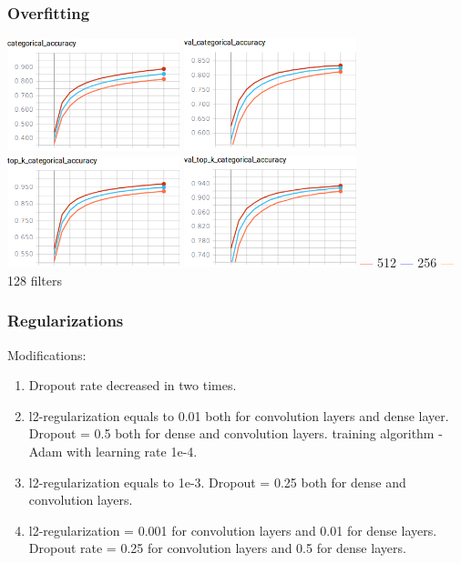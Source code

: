 \documentclass[14pt]{beamer}
\begin{document}
		\begin{frame}
			\frametitle{Overfitting}
			\hfil\hfil\includegraphics[width=5cm]{part4//3CNN_train_category_accuracy}
			\hfil\hfil\includegraphics[width=5cm]{part4//3CNN_val_category_accuracy}\newline
			\vfil
			\hfil\hfil\includegraphics[width=5cm]{part4/3CNN_train_top_k_accuracy}
			\hfil\hfil\includegraphics[width=5cm]{part4/3CNN_val_top_k_accuracy}\newline
			\textcolor{red}{---} 512
			\textcolor{blue}{---} 256
			\textcolor{orange}{---} 128  filters
		\end{frame}
		
		
	\begin{frame}
		\frametitle{Regularizations}
		Modifications:
		\begin{enumerate}
			\item Dropout rate decreased in two times.
			\item l2-regularization equals to 0.01 both for convolution layers and dense layer. 
			Dropout = 0.5 both for dense and convolution layers. 
		    training algorithm - Adam with learning rate 1e-4. 
			\item l2-regularization equals to 1e-3. 
			Dropout = 0.25 both for dense and convolution layers. 
			\item l2-regularization =  0.001 for convolution layers and 0.01 for dense layers. 
			Dropout rate = 0.25 for convolution layers and 0.5 for dense layers.
		\end{enumerate}
	\end{frame}
			
\end{document}
